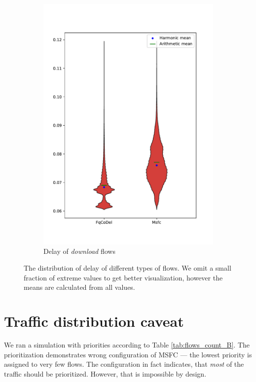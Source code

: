 \begin{figure}
\begin{subfigure}[b]{0.475\textwidth}
		\includegraphics[width=\textwidth]{drawings/type5-delay-down_A}
		\caption[]%
		{{\small Delay of \emph{download} flows}}    
		\label{fig:delay_download}
	\end{subfigure}
	\caption[]
	{\small The distribution of delay of different types of flows. We omit a small fraction of extreme values to get better visualization, however the means are calculated from all values.} 
	\label{fig:delay_flows_A}
\end{figure}



\clearpage
\section{Traffic distribution caveat}



We ran a simulation with priorities according to Table \ref{tab:flows_count_B}. The prioritization demonstrates wrong configuration of MSFC --- the lowest priority is assigned to very few flows. The configuration in fact indicates, that \emph{most} of the traffic should be prioritized. However, that is impossible by design.

